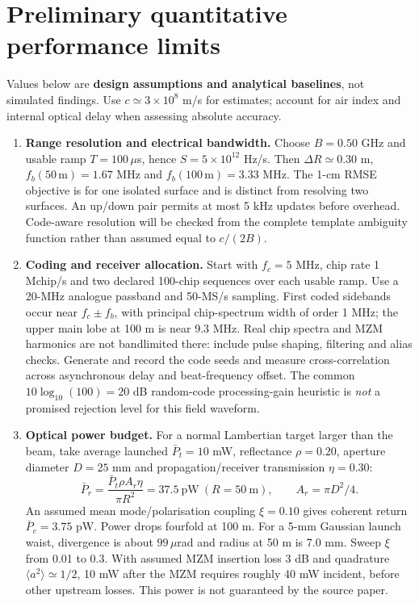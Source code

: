 \documentclass[10pt,letterpaper]{article}
\begin{document}
\section{Preliminary quantitative performance limits}
Values below are \textbf{design assumptions and analytical baselines}, not simulated findings. Use $c\simeq3\times10^8$ m/s for estimates; account for air index and internal optical delay when assessing absolute accuracy.
\begin{enumerate}
\item \textbf{Range resolution and electrical bandwidth.} Choose $B=0.50$ GHz and usable ramp $T=100\,\mu$s, hence $S=5\times10^{12}$ Hz/s. Then $\Delta R\simeq0.30$ m, $f_b(50\,\mathrm m)=1.67$ MHz and $f_b(100\,\mathrm m)=3.33$ MHz. The 1-cm RMSE objective is for one isolated surface and is distinct from resolving two surfaces. An up/down pair permits at most 5 kHz updates before overhead. Code-aware resolution will be checked from the complete template ambiguity function rather than assumed equal to $c/(2B)$.
\item \textbf{Coding and receiver allocation.} Start with $f_c=5$ MHz, chip rate 1 Mchip/s and two declared 100-chip sequences over each usable ramp. Use a 20-MHz analogue passband and 50-MS/s sampling. First coded sidebands occur near $f_c\pm f_b$, with principal chip-spectrum width of order 1 MHz; the upper main lobe at 100 m is near 9.3 MHz. Real chip spectra and MZM harmonics are not bandlimited there: include pulse shaping, filtering and alias checks. Generate and record the code seeds and measure cross-correlation across asynchronous delay and beat-frequency offset. The common $10\log_{10}(100)=20$ dB random-code processing-gain heuristic is \emph{not} a promised rejection level for this field waveform.
\item \textbf{Optical power budget.} For a normal Lambertian target larger than the beam, take average launched $\bar P_t=10$ mW, reflectance $\rho=0.20$, aperture diameter $D=25$ mm and propagation/receiver transmission $\eta=0.30$:
\begin{equation}
\bar P_r=\frac{\bar P_t\rho A_r\eta}{\pi R^2}=37.5\ \mathrm{pW}\ (R=50\ \mathrm m),\qquad A_r=\pi D^2/4.
\end{equation}
An assumed mean mode/polarisation coupling $\xi=0.10$ gives coherent return $\bar P_c=3.75$ pW. Power drops fourfold at 100 m. For a 5-mm Gaussian launch waist, divergence is about $99\,\mu$rad and radius at 50 m is 7.0 mm. Sweep $\xi$ from 0.01 to 0.3. With assumed MZM insertion loss 3 dB and quadrature $\langle a^2\rangle\simeq1/2$, 10 mW after the MZM requires roughly 40 mW incident, before other upstream losses. This power is not guaranteed by the source paper.

\end{enumerate}
\end{document}

